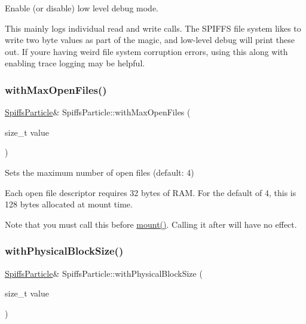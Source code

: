 Enable (or disable) low level debug mode. 

This mainly logs individual read and write calls. The S\+P\+I\+F\+FS file system likes to write two byte values as part of the magic, and low-\/level debug will print these out. If you\textquotesingle{}re having weird file system corruption errors, using this along with enabling trace logging may be helpful. \mbox{\label{class_spiffs_particle_a0a88791b69d2711a32b31cef465f2ebe}} 
\subsubsection{\texorpdfstring{with\+Max\+Open\+Files()}{withMaxOpenFiles()}}
{\footnotesize\ttfamily \mbox{\hyperlink{class_spiffs_particle}{Spiffs\+Particle}}\& Spiffs\+Particle\+::with\+Max\+Open\+Files (\begin{DoxyParamCaption}\item[{size\+\_\+t}]{value }\end{DoxyParamCaption})\hspace{0.3cm}{\ttfamily [inline]}}



Sets the maximum number of open files (default\+: 4) 

Each open file descriptor requires 32 bytes of R\+AM. For the default of 4, this is 128 bytes allocated at mount time.

Note that you must call this before \mbox{\hyperlink{class_spiffs_particle_a55ce37570d764bb8d00698903211fee8}{mount()}}. Calling it after will have no effect. \mbox{\label{class_spiffs_particle_af99c2e3bdc38de7f33761b97a2680cec}} 
\subsubsection{\texorpdfstring{with\+Physical\+Block\+Size()}{withPhysicalBlockSize()}}
{\footnotesize\ttfamily \mbox{\hyperlink{class_spiffs_particle}{Spiffs\+Particle}}\& Spiffs\+Particle\+::with\+Physical\+Block\+Size (\begin{DoxyParamCaption}\item[{size\+\_\+t}]{value }\end{DoxyParamCaption})\hspace{0.3cm}{\ttfamily [inline]}}



